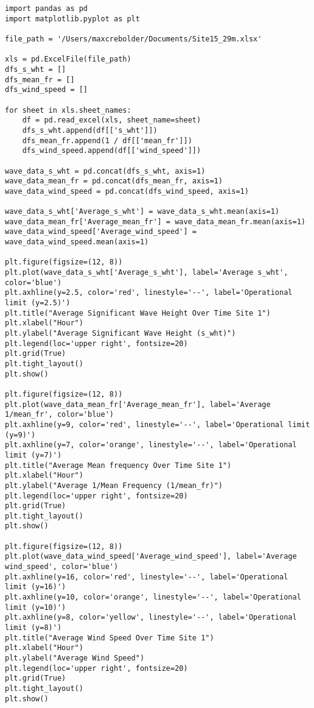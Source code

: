 \label{append:operational limit}
\begin{verbatim}
import pandas as pd
import matplotlib.pyplot as plt

file_path = '/Users/maxcrebolder/Documents/Site15_29m.xlsx'

xls = pd.ExcelFile(file_path)
dfs_s_wht = []
dfs_mean_fr = []
dfs_wind_speed = []

for sheet in xls.sheet_names:
    df = pd.read_excel(xls, sheet_name=sheet)
    dfs_s_wht.append(df[['s_wht']])       
    dfs_mean_fr.append(1 / df[['mean_fr']]) 
    dfs_wind_speed.append(df[['wind_speed']])  

wave_data_s_wht = pd.concat(dfs_s_wht, axis=1)
wave_data_mean_fr = pd.concat(dfs_mean_fr, axis=1)
wave_data_wind_speed = pd.concat(dfs_wind_speed, axis=1)

wave_data_s_wht['Average_s_wht'] = wave_data_s_wht.mean(axis=1)
wave_data_mean_fr['Average_mean_fr'] = wave_data_mean_fr.mean(axis=1)
wave_data_wind_speed['Average_wind_speed'] = wave_data_wind_speed.mean(axis=1)

plt.figure(figsize=(12, 8))
plt.plot(wave_data_s_wht['Average_s_wht'], label='Average s_wht', color='blue')
plt.axhline(y=2.5, color='red', linestyle='--', label='Operational limit (y=2.5)')
plt.title("Average Significant Wave Height Over Time Site 1")
plt.xlabel("Hour")
plt.ylabel("Average Significant Wave Height (s_wht)")
plt.legend(loc='upper right', fontsize=20) 
plt.grid(True)
plt.tight_layout()
plt.show()

plt.figure(figsize=(12, 8))
plt.plot(wave_data_mean_fr['Average_mean_fr'], label='Average 1/mean_fr', color='blue')
plt.axhline(y=9, color='red', linestyle='--', label='Operational limit (y=9)')
plt.axhline(y=7, color='orange', linestyle='--', label='Operational limit (y=7)')
plt.title("Average Mean frequency Over Time Site 1")
plt.xlabel("Hour")
plt.ylabel("Average 1/Mean Frequency (1/mean_fr)")
plt.legend(loc='upper right', fontsize=20)  
plt.grid(True)
plt.tight_layout()
plt.show()

plt.figure(figsize=(12, 8))
plt.plot(wave_data_wind_speed['Average_wind_speed'], label='Average wind_speed', color='blue')
plt.axhline(y=16, color='red', linestyle='--', label='Operational limit (y=16)')
plt.axhline(y=10, color='orange', linestyle='--', label='Operational limit (y=10)')
plt.axhline(y=8, color='yellow', linestyle='--', label='Operational limit (y=8)')
plt.title("Average Wind Speed Over Time Site 1")
plt.xlabel("Hour")
plt.ylabel("Average Wind Speed")
plt.legend(loc='upper right', fontsize=20)  
plt.grid(True)
plt.tight_layout()
plt.show()
\end{verbatim}
